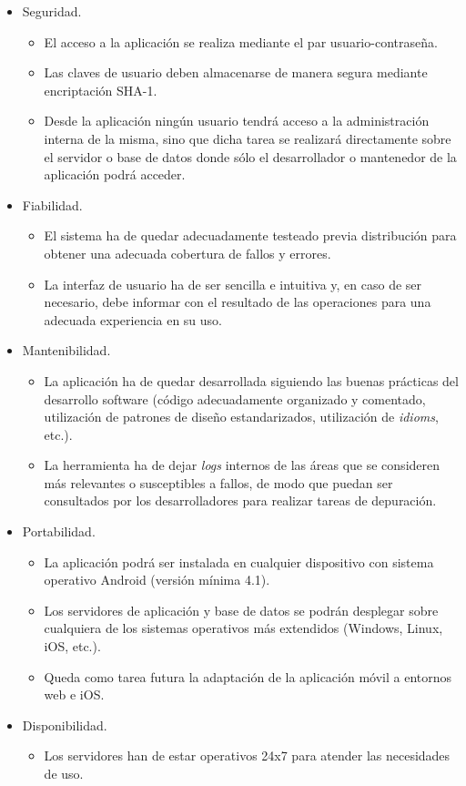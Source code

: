 \begin{itemize}
	\item Seguridad.
	\begin{itemize}
		\item El acceso a la aplicación se realiza mediante el par usuario-contraseña.
		\item Las claves de usuario deben almacenarse de manera segura mediante encriptación SHA-1.
		\item Desde la aplicación ningún usuario tendrá acceso a la administración interna de la misma, sino que dicha tarea se realizará directamente sobre el servidor o base de datos donde sólo el desarrollador o mantenedor de la aplicación podrá acceder.
	\end{itemize}
	\item Fiabilidad.
	\begin{itemize}
		\item El sistema ha de quedar adecuadamente testeado previa distribución para obtener una adecuada cobertura de fallos y errores.
		\item La interfaz de usuario ha de ser sencilla e intuitiva y, en caso de ser necesario, debe informar con el resultado de las operaciones para una adecuada experiencia en su uso.
	\end{itemize}
	\item Mantenibilidad.
	\begin{itemize}
		\item La aplicación ha de quedar desarrollada siguiendo las buenas prácticas del desarrollo software (código adecuadamente organizado y comentado, utilización de patrones de diseño estandarizados, utilización de \textit{idioms}, etc.).
		\item La herramienta ha de dejar \textit{logs} internos de las áreas que se consideren más relevantes o susceptibles a fallos, de modo que puedan ser consultados por los desarrolladores para realizar tareas de depuración.
	\end{itemize}
	\item Portabilidad. 
	\begin{itemize}
		\item La aplicación podrá ser instalada en cualquier dispositivo con sistema operativo Android (versión mínima 4.1).
		\item Los servidores de aplicación y base de datos se podrán desplegar sobre cualquiera de los sistemas operativos más extendidos (Windows, Linux, iOS, etc.).
		\item Queda como tarea futura la adaptación de la aplicación móvil a entornos web e iOS.
	\end{itemize}
	\item Disponibilidad. 
	\begin{itemize}
		\item Los servidores han de estar operativos 24x7 para atender las necesidades de uso.
	\end{itemize}
\end{itemize}

